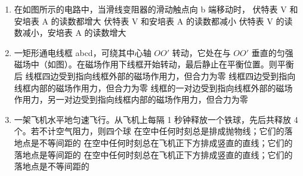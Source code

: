 \documentclass[\gkver]{gaokaozhenti}
\begin{document}
\begin{enumerate}

\item
在如图所示的电路中，当滑线变阻器的滑动触点向 b 端移动时，
{伏特表 V 和安培表 A 的读数都增大}
{伏特表 V 和安培表 A 的读数都减小}
{伏特表 V 的读数减小，安培表 A 的读数增大}


\item
一矩形通电线框 abcd，可绕其中心轴 $OO'$ 转动，它处在与 $OO'$ 垂直的匀强磁场中（如图）。在磁场作用下线框开始转动，最后静止在平衡位置。则平衡后
{线框四边受到指向线框外部的磁场作用力，但合力为零}
{线框四边受到指向线框内部的磁场作用力，但合力为零}
{线框的一对边受到指向线框外部的磁场作用力，另一对边受到指向线框内部的磁场作用力，但合力为零}


\item
一架飞机水平地匀速飞行。从飞机上每隔 1 秒钟释放一个铁球，先后共释放 4 个。若不计空气阻力，则四个球
{在空中任何时刻总是排成抛物线；它们的落地点是不等间距的}
{在空中任何时刻总在飞机正下方排成竖直的直线；它们的落地点是等间距的}
{在空中任何时刻总在飞机正下方排成竖直的直线；它们的落地点是不等间距的}


\end{enumerate}
\end{document}
